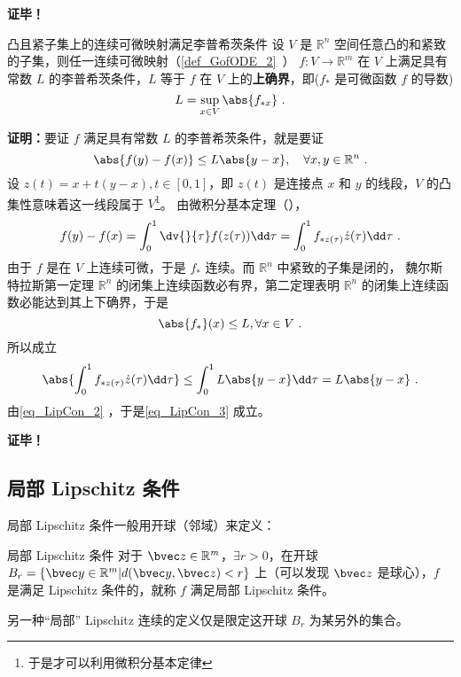 \textbf{证毕！}

\begin{theorem}{凸且紧子集上的连续可微映射满足李普希茨条件}\label{the_LipCon_2}
设 $V$ 是 $\mathbb R^n$ 空间任意凸的和紧致的子集，则任一连续可微映射（\autoref{def_GofODE_2}~） $f:V\rightarrow \mathbb R^m$ 在 $V$ 上满足具有常数 $L$ 的李普希茨条件，$L$ 等于 $f$ 在 $V$ 上的\textbf{上确界}，即($f_*$ 是可微函数 $f$ 的导数)
\begin{equation}
L=\sup_{x\in V}\abs{f_{*x}}~.
\end{equation}
\end{theorem}
\textbf{证明：}要证 $f$ 满足具有常数 $L$ 的李普希茨条件，就是要证
\begin{equation}\label{eq_LipCon_3}
\abs{f(y)-f(x)}\leq L\abs{y-x},\quad\forall x,y\in\mathbb R^n~.
\end{equation}
设 $z(t)=x+t(y-x),t\in[0,1]$，即 $z(t)$ 是连接点 $x$ 和 $y$ 的线段，$V$ 的凸集性意味着这一线段属于 $V$\footnote{于是才可以利用微积分基本定律}。
由微积分基本定理（），
\begin{equation}\label{eq_LipCon_2}
f(y)-f(x)=\int_0^1\dv{}{\tau}f(z(\tau))\dd\tau=\int_0^1f_{*z(\tau)}\dot z(\tau)\dd\tau~.
\end{equation}
由于 $f$ 是在 $V$ 上连续可微，于是 $f_*$ 连续。而 $\mathbb R^n$ 中紧致的子集是闭的， 魏尔斯特拉斯第一定理 $\mathbb R^n$ 的闭集上连续函数必有界，第二定理表明 $\mathbb R^n$ 的闭集上连续函数必能达到其上下确界，于是
 \begin{equation}
 \abs{f_*}(x)\leq L ,\forall x\in V ~.
 \end{equation}
所以成立
\begin{equation}
\abs{\int_0^1f_{*z(\tau)}\dot z(\tau)\dd\tau}\leq\int_0^1L\abs{y-x}\dd\tau=L\abs{y-x}~.
\end{equation}
由\autoref{eq_LipCon_2} ，于是\autoref{eq_LipCon_3} 成立。

\textbf{证毕！}

\subsection{局部 Lipschitz 条件}
局部 Lipschitz 条件一般用开球（邻域）来定义：
\begin{definition}{局部 Lipschitz 条件}
对于 $\bvec z \in \mathbb R^m$，$\exists r > 0$，在开球 $B_{r} = \{\bvec y \in \mathbb R^m | d(\bvec y, \bvec z) < r\}$ 上（可以发现 $\bvec z$ 是球心），$f$ 是满足 Lipschitz 条件的，就称 $f$ 满足局部 Lipschitz 条件。
\end{definition}

另一种“局部” Lipschitz 连续的定义仅是限定这开球 $B_r$ 为某另外的集合。